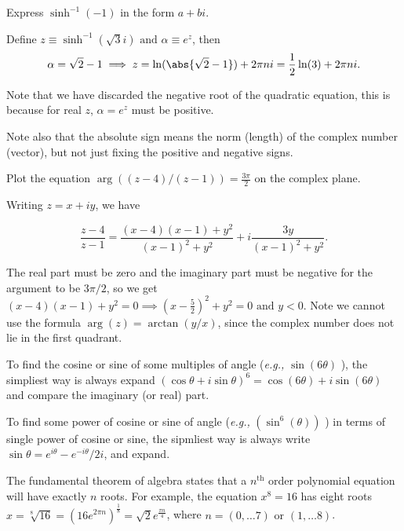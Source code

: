 \documentclass[english,a4paper,12pt]{report}
\begin{document}
 {Express \(\sinh^{-1}(-1) \) in the form \(a+bi\).   }
 {Define \(z \equiv \sinh^{-1} (\sqrt{3}i) \text { and } \alpha \equiv e^{z} \), then 
 \begin{equation}
        \alpha = \sqrt{2}-1   \implies  z = \ln (\abs{\sqrt{2}-1 })  + 2\pi ni = \frac{1}{2} \ln (3 )+2\pi ni.
 \end{equation}

 Note that we have discarded the negative root of the quadratic equation, this is because for real \(z\), \(\alpha = e^{z} \) must be positive.   

 Note also that the absolute sign means the norm (length) of the complex number (vector), but not just fixing the positive and negative signs.
 
 } 
 


{Plot the equation \( \arg \left((z-4)/(z-1)\right)=\frac{3\pi }{2} \) on the complex plane. }
{Writing \(z = x+iy\), we have 

\begin{equation}
    \frac{z-4}{z-1} = \frac{(x-4)(x-1)+y^2}{(x-1)^2+y^2} + i \frac{3y}{(x-1)^2+y^2}.  
\end{equation}

The real part must be zero and the imaginary part must be negative for the argument to be \(3\pi /2\), so we get \((x-4)(x-1)+y^2=0 \implies (x-\frac{5}{2} )^2+y^2 = 0 \text { and } y<0\). Note we cannot use the formula \(\arg (z) =  \arctan {\left(y /x\right) } \), since the complex number does not lie in the first quadrant.   
} 

To find the cosine or sine of some multiples of angle (\textit{e.g.,} \(\sin (6\theta )\) ), the simpliest way is always expand \((\cos \theta +i\sin \theta )^6 = \cos (6\theta ) + i\sin (6\theta )\) and compare the imaginary (or real) part. 

To find some power of cosine or sine of angle (\textit{e.g.,} \((\sin ^6(\theta ))\) ) in terms of single power of cosine or sine, the sipmliest way is always write \(\sin \theta = e^{i \theta }-e^{-i \theta }  /2i \), and expand. 

The fundamental theorem of algebra states that a \(n^{\text{th}}\) order polynomial equation will have exactly \(n\) roots. For example, the equation \(x^{8} = 16\) has eight roots \(x = \sqrt[8]{16} = (16e^{2\pi n})^{\frac{1}{8} } = \sqrt{2}e^{\frac{\pi n}{4} }\), where \(n = (0,\ldots 7) \text { or } (1,\ldots 8)\).   
\end{document}
